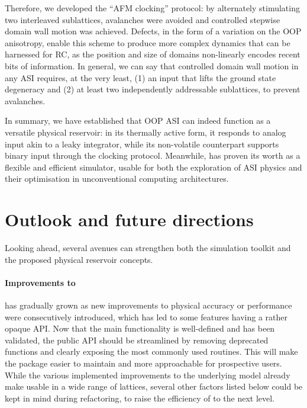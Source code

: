 Therefore, we developed the ``AFM clocking'' protocol: by alternately stimulating two interleaved sublattices, avalanches were avoided and controlled stepwise domain wall motion was achieved.
Defects, in the form of a variation on the OOP anisotropy, enable this scheme to produce more complex dynamics that can be harnessed for RC, as the position and size of domains non-linearly encodes recent bits of information.
In general, we can say that controlled domain wall motion in any ASI requires, at the very least, (1) an input that lifts the ground state degeneracy and (2) at least two independently addressable sublattices, to prevent avalanches. \\\par

In summary, we have established that OOP ASI can indeed function as a versatile physical reservoir: in its thermally active form, it responds to analog input akin to a leaky integrator, while its non-volatile counterpart supports binary input through the clocking protocol. %
Meanwhile, \hotspice has proven its worth as a flexible and efficient simulator, usable for both the exploration of ASI physics and their optimisation in unconventional computing architectures.

\newpage
\section{Outlook and future directions}
Looking ahead, several avenues can strengthen both the \hotspice simulation toolkit and the proposed physical reservoir concepts.

\paragraph{Improvements to \hotspice}
\hotspice has gradually grown as new improvements to physical accuracy or performance were consecutively introduced, which has led to some features having a rather opaque API.
Now that the main functionality is well-defined and has been validated, the public API should be streamlined by removing deprecated functions and clearly exposing the most commonly used routines. %
This will make the package easier to maintain and more approachable for prospective users.
While the various implemented improvements to the underlying model already make \hotspice usable in a wide range of lattices, several other factors listed below could be kept in mind during refactoring, to raise the efficiency of \hotspice to the next level. \\\par

